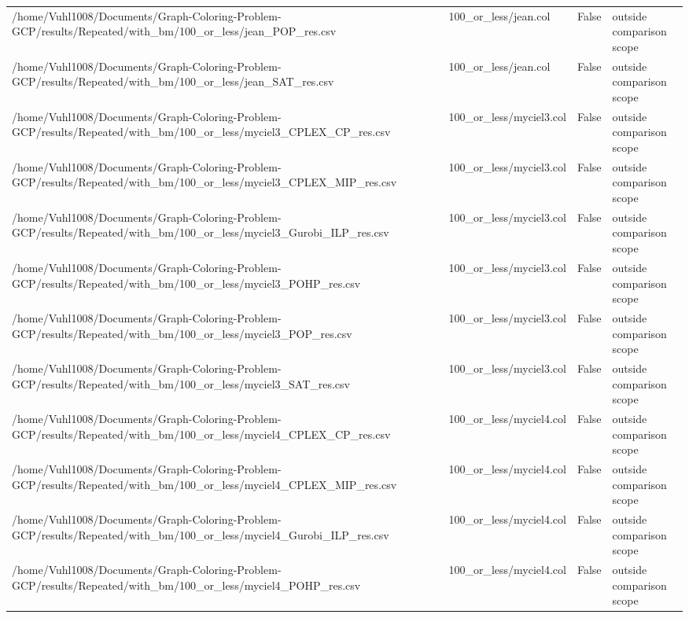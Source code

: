 \begin{table}[htbp]
\begin{tabular}{llll}
/home/Vuhl1008/Documents/Graph-Coloring-Problem-GCP/results/Repeated/with\_bm/100\_or\_less/jean\_POP\_res.csv & 100\_or\_less/jean.col & False & outside comparison scope \\
/home/Vuhl1008/Documents/Graph-Coloring-Problem-GCP/results/Repeated/with\_bm/100\_or\_less/jean\_SAT\_res.csv & 100\_or\_less/jean.col & False & outside comparison scope \\
/home/Vuhl1008/Documents/Graph-Coloring-Problem-GCP/results/Repeated/with\_bm/100\_or\_less/myciel3\_CPLEX\_CP\_res.csv & 100\_or\_less/myciel3.col & False & outside comparison scope \\
/home/Vuhl1008/Documents/Graph-Coloring-Problem-GCP/results/Repeated/with\_bm/100\_or\_less/myciel3\_CPLEX\_MIP\_res.csv & 100\_or\_less/myciel3.col & False & outside comparison scope \\
/home/Vuhl1008/Documents/Graph-Coloring-Problem-GCP/results/Repeated/with\_bm/100\_or\_less/myciel3\_Gurobi\_ILP\_res.csv & 100\_or\_less/myciel3.col & False & outside comparison scope \\
/home/Vuhl1008/Documents/Graph-Coloring-Problem-GCP/results/Repeated/with\_bm/100\_or\_less/myciel3\_POHP\_res.csv & 100\_or\_less/myciel3.col & False & outside comparison scope \\
/home/Vuhl1008/Documents/Graph-Coloring-Problem-GCP/results/Repeated/with\_bm/100\_or\_less/myciel3\_POP\_res.csv & 100\_or\_less/myciel3.col & False & outside comparison scope \\
/home/Vuhl1008/Documents/Graph-Coloring-Problem-GCP/results/Repeated/with\_bm/100\_or\_less/myciel3\_SAT\_res.csv & 100\_or\_less/myciel3.col & False & outside comparison scope \\
/home/Vuhl1008/Documents/Graph-Coloring-Problem-GCP/results/Repeated/with\_bm/100\_or\_less/myciel4\_CPLEX\_CP\_res.csv & 100\_or\_less/myciel4.col & False & outside comparison scope \\
/home/Vuhl1008/Documents/Graph-Coloring-Problem-GCP/results/Repeated/with\_bm/100\_or\_less/myciel4\_CPLEX\_MIP\_res.csv & 100\_or\_less/myciel4.col & False & outside comparison scope \\
/home/Vuhl1008/Documents/Graph-Coloring-Problem-GCP/results/Repeated/with\_bm/100\_or\_less/myciel4\_Gurobi\_ILP\_res.csv & 100\_or\_less/myciel4.col & False & outside comparison scope \\
/home/Vuhl1008/Documents/Graph-Coloring-Problem-GCP/results/Repeated/with\_bm/100\_or\_less/myciel4\_POHP\_res.csv & 100\_or\_less/myciel4.col & False & outside comparison scope \\

\end{tabular}
\end{table}
